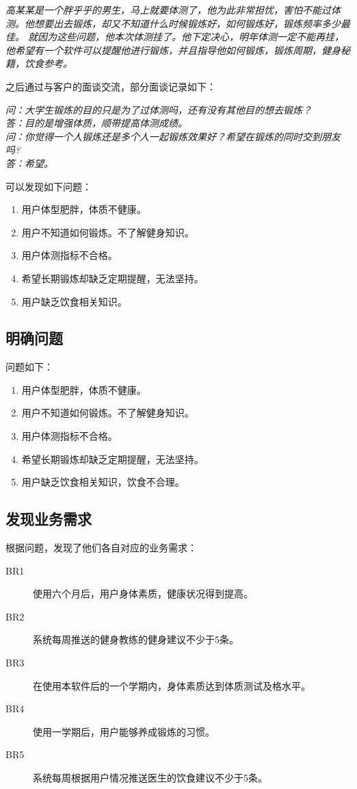\documentclass[UTF8]{ctexart}
\begin{document}
\begin{displayquote}
\textit{高某某是一个胖乎乎的男生，马上就要体测了，他为此非常担忧，害怕不能过体测。他想要出去锻炼，却又不知道什么时候锻炼好，如何锻炼好，锻炼频率多少最佳。
就因为这些问题，他本次体测挂了。他下定决心，明年体测一定不能再挂，他希望有一个软件可以提醒他进行锻炼，并且指导他如何锻炼，锻炼周期，健身秘籍，饮食参考。}
\end{displayquote}

之后通过与客户的面谈交流，部分面谈记录如下：

\begin{displayquote}
\textit{问：大学生锻炼的目的只是为了过体测吗，还有没有其他目的想去锻炼？\\
答：目的是增强体质，顺带提高体测成绩。\\
问：你觉得一个人锻炼还是多个人一起锻炼效果好？希望在锻炼的同时交到朋友吗?\\
答：希望。
}
\end{displayquote}

可以发现如下问题：

 \begin{enumerate}
    \item 用户体型肥胖，体质不健康。
    \item 用户不知道如何锻炼。不了解健身知识。
    \item 用户体测指标不合格。
    \item 希望长期锻炼却缺乏定期提醒，无法坚持。
    \item 用户缺乏饮食相关知识。
 \end{enumerate}
\subsection{明确问题}
问题如下：
\begin{enumerate}
   \item 用户体型肥胖，体质不健康。
   \item 用户不知道如何锻炼。不了解健身知识。
   \item 用户体测指标不合格。
   \item 希望长期锻炼却缺乏定期提醒，无法坚持。
   \item 用户缺乏饮食相关知识，饮食不合理。
\end{enumerate}
\subsection{发现业务需求}
根据问题，发现了他们各自对应的业务需求：
\begin{description}
   \item[BR1] 使用六个月后，用户身体素质，健康状况得到提高。
   \item[BR2] 系统每周推送的健身教练的健身建议不少于5条。
   \item[BR3] 在使用本软件后的一个学期内，身体素质达到体质测试及格水平。
   \item[BR4] 使用一学期后，用户能够养成锻炼的习惯。
   \item[BR5] 系统每周根据用户情况推送医生的饮食建议不少于5条。
\end{description}
\end{document}
